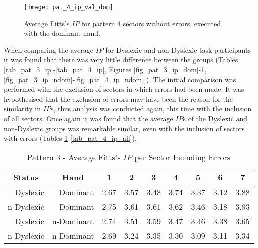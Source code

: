 	\begin{figure}[h]
		\centering
		\texttt{[image: pat\_4\_ip\_val\_dom]}
		\caption{Average Fitts's \(IP\) for pattern 4 sectors without errors, executed with the dominant hand.}
		\label{fig_pat_4_ip_dom}
	\end{figure}

	When comparing the average \(IP\) for Dyslexic and non-Dyslexic task participants it was found that there was very little difference between the groups (Tables \ref{tab_pat_3_ip}-\ref{tab_pat_4_ip}, Figures \ref{fig_pat_3_ip_dom}-\ref{fig_pat_4_ip_dom}, \ref{fig_pat_3_ip_ndom}-\ref{fig_pat_4_ip_ndom} ). The initial comparison was performed with the exclusion of sectors in which errors had been made. It was hypothesised that the exclusion of errors may have been the reason for the similarity in \(IP\)s, thus analysis was conducted again, this time with the inclusion of all sectors. Once again it was found that the average \(IP\)s of the Dyslexic and non-Dyslexic groups was remarkable similar, even with the inclusion of sectors with errors (Tables \ref{tab_pat_3_ip_all}-\ref{tab_pat_4_ip_all}).
	
	\begin{table}[h]
		\centering
		\caption{Pattern 3 - Average Fitts's \(IP\) per Sector Including Errors}
		\label{tab_pat_3_ip_all}
		\begin{tabularx}{\textwidth}{|r|r|X|X|X|X|X|X|X|}
			\hline
			\multicolumn{1}{|c|}{\textbf{Status}} & \multicolumn{1}{c|}{\textbf{Hand}} & \multicolumn{1}{c|}{\textbf{1}} & \multicolumn{1}{c|}{\textbf{2}} & \multicolumn{1}{c|}{\textbf{3}} & \multicolumn{1}{c|}{\textbf{4}} & \multicolumn{1}{c|}{\textbf{5}} & \multicolumn{1}{c|}{\textbf{6}} & \multicolumn{1}{c|}{\textbf{7}} \\ \hline
			Dyslexic                              & Dominant                           & 2.67       & 3.57       & 3.48       & 3.74       & 3.37       & 3.12       & 3.88       \\ \hline
			n-Dyslexic                          & Dominant                           & 2.75       & 3.61       & 3.61       & 3.62       & 3.46       & 3.18       & 3.93       \\ \hline
			Dyslexic                              & n-Dominant                       & 2.74       & 3.51       & 3.59       & 3.47       & 3.46       & 3.38       & 3.65       \\ \hline
			n-Dyslexic                          & n-Dominant                       & 2.69       & 3.24       & 3.35       & 3.30       & 3.09       & 3.11       & 3.34       \\ \hline
		\end{tabularx}
	\end{table}


